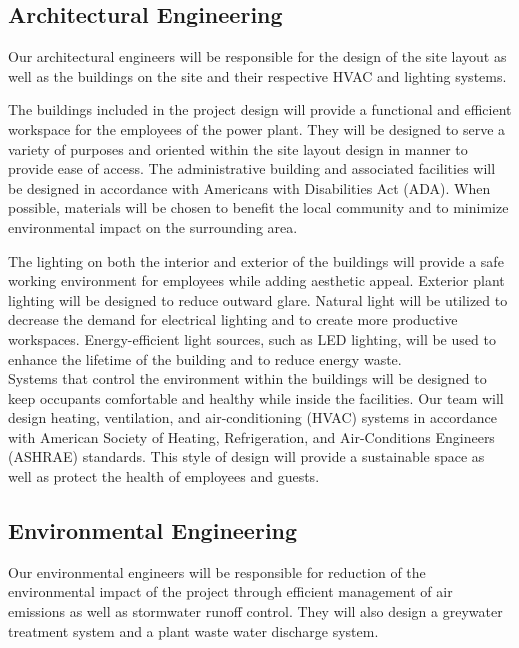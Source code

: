 \documentclass{ceri}
\begin{document}
\subsection{Architectural Engineering}
Our architectural engineers will be responsible for the design of the site layout as well as the buildings on the site and their respective HVAC and lighting systems.\\
\newline

The buildings included in the project design will provide a functional and efficient workspace for the employees of the power plant. They will be designed to serve a variety of purposes and oriented within the site layout design in manner to provide ease of access. The administrative building and associated facilities will be designed in accordance with Americans with Disabilities Act (ADA). When possible, materials will be chosen to benefit the local community and to minimize environmental impact on the surrounding area.\\
\newline

The lighting on both the interior and exterior of the buildings will provide a safe working environment for employees while adding aesthetic appeal. Exterior plant lighting will be designed to reduce outward glare. Natural light will be utilized to decrease the demand for electrical lighting and to create more productive workspaces. Energy-efficient light sources, such as LED lighting, will be used to enhance the lifetime of the building and to reduce energy waste.\\
\newline
Systems that control the environment within the buildings will be designed to keep occupants comfortable and healthy while inside the facilities. Our team will design heating, ventilation, and air-conditioning (HVAC) systems in accordance with American Society of Heating, Refrigeration, and Air-Conditions Engineers (ASHRAE) standards. This style of design will provide a sustainable space as well as protect the health of employees and guests.
\newpage
\subsection{Environmental Engineering}
Our environmental engineers will be responsible for reduction of the environmental impact of the project through efficient management of air emissions as well as stormwater runoff control. They will also design a greywater treatment system and a plant waste water discharge system.\\
\newline
\end{document}
